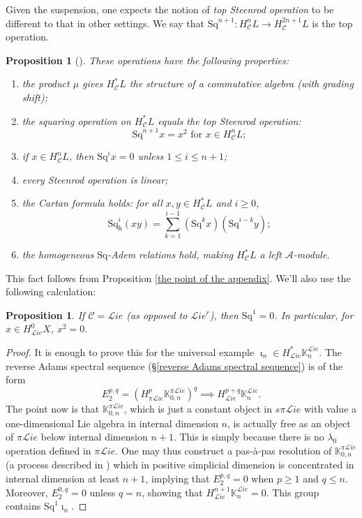 \documentclass[11pt]{amsart} \renewcommand{\baselinestretch}{1.2}
\theoremstyle{plain}
\newtheorem{prop}[thm]{Proposition}
\theoremstyle{definition}
\renewcommand{\to}{\longrightarrow}
\newcommand{\scrL}{\mathscr{L}}
\newcommand{\calA}{\mathcal{A}}
\newcommand{\calc}{\mathcal{C}}
\newcommand{\citeBOX}[2][]{\cite[\mbox{#1}]{#2}}
\newcommand{\PA}[1]{\pi#1}
\newcommand{\Sq}{\mathrm{Sq}}
\newcommand{\LieSteen}{\calA}
\newcommand{\liealgs}{{\scrL\!\textit{ie}}}
\newcommand{\restliealgs}{{\scrL\!\textit{ie}^\textit{r}}}
\newcommand{\dhor}{_\mathrm{h}}
\newcommand{\Sqh}{\mathrm{Sq}\dhor}
\begin{document}
\begin{Constructing cohomology operations}
Given the suspension, one expects the notion of \emph{top Steenrod operation} to be different to that in other settings. We say that $\Sq^{n+1}:H^n_\calc L\to H^{2n+1}_\calc L$ is the top operation.
\begin{prop}[{\citeBOX[\S5.3]{PriddySimplicialLie.pdf}}]
\label{omnibus on coh of simp lie algs}These operations have the following properties:
\begin{enumerate}
\item the product $\mu$ gives $H^*_{\calc}L$ the structure of a commutative algebra (with grading shift);
\item the squaring operation on $H^*_{\calc}L$ equals the \emph{top Steenrod operation}:
\[\Sq^{n+1}x=x^{2}\text{\ \ for $x\in H^n_{\calc}L$};\]
\item \label{Sq unstable vanishing} if $x\in H^n_{\calc}L$, then $\Sq^ix=0$ unless $1\leq i\leq n+1$;
\item every Steenrod operation is linear;
\item the \emph{Cartan formula} holds:  for all $x,y\in   H^*_{\calc}L$ and $i\geq0$,
\[\Sqh^i(xy)=\textstyle\sum_{k=1}^{i-1}(\Sq^kx)(\Sq^{i-k}y);\]
\item \label{yeah H is a Stmodule} the  homogeneous $\Sq$-Adem relations hold, making $H^{*}_\calc L$ a left $\LieSteen$-module.
\end{enumerate}
\end{prop}
This fact follows from Proposition \ref{the point of the appendix}. We'll also use the following calculation:
\begin{prop}
\label{prop on sq1 on lie not rest}
If $\calc=\liealgs$ (as opposed to $\restliealgs$), then $\Sq^1=0$. In particular, for $x\in H^0_{\liealgs}X$, $x^2=0$.
\end{prop}
\begin{proof}
It is enough to prove this for the universal example $\imath_n\in H^*_{\liealgs}\mathbb{K}_n^{\liealgs}$. The reverse Adams spectral sequence (\S\ref{reverse Adams spectral sequence}) is of the form
\[E_2^{p,q}=(H^{p}_{\PA{\liealgs}}\mathbb{K}_{0,n}^{\PA{\liealgs}})^{q}\implies H^{p+q}_{\liealgs}\mathbb{K}_n^{\liealgs}.\]
The point now is that $\mathbb{K}_{0,n}^{\PA{\liealgs}}$, which is just a constant object in $s\PA{\liealgs}$ with value a one-dimensional Lie algebra in internal dimension $n$, is actually free as an object of $\PA{\liealgs}$ below internal dimension $n+1$. This is simply because there is no $\lambda_0$ operation defined in $\PA{\liealgs}$. One may thus construct a pas-\`a-pas resolution of $\mathbb{K}_{0,n}^{\PA{\liealgs}}$ (a process described in \cite{Andre-StepByStep}) which in positive simplicial dimension is concentrated in internal dimension at least $n+1$, implying that $E_2^{p,q}=0$ when $p\geq1$ and $q\leq n$. Moreover, $E_2^{0,q}=0$ unless $q=n$, showing that $H^{n+1}_{\liealgs}\mathbb{K}_n^{\liealgs}=0$. This group contains $\Sq^1\imath_n$.

\end{proof}
\end{Constructing cohomology operations}
\end{document}
